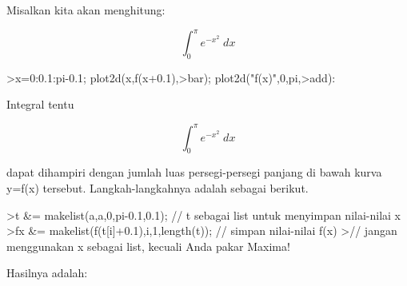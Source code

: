 \documentclass[a4paper,10pt]{article}
\begin{document}
\begin{eulernotebook}
\begin{eulercomment}
\begin{eulercomment}
\begin{eulercomment}
\begin{eulercomment}
\begin{eulercomment}
\begin{eulercomment}
\begin{eulercomment}
\begin{eulercomment}
\begin{eulercomment}
\begin{eulercomment}
\begin{eulercomment}
\begin{eulercomment}
\begin{eulercomment}
\begin{eulercomment}
\begin{eulercomment}
\begin{eulercomment}
\begin{eulercomment}
\begin{eulercomment}
\begin{eulercomment}
\begin{eulercomment}
\begin{eulercomment}
Misalkan kita akan menghitung:

\end{eulercomment}
\begin{eulerformula}
\[
\int_{0}^{\pi}{e^ {- x^2 }\;dx}
\]
\end{eulerformula}
\begin{eulerprompt}
>x=0:0.1:pi-0.1; plot2d(x,f(x+0.1),>bar); plot2d("f(x)",0,pi,>add):
\end{eulerprompt}
\begin{eulercomment}
Integral tentu

\end{eulercomment}
\begin{eulerformula}
\[
\int_{0}^{\pi}{e^ {- x^2 }\;dx}
\]
\end{eulerformula}
\begin{eulercomment}
dapat dihampiri dengan jumlah luas persegi-persegi panjang di bawah
kurva y=f(x) tersebut. Langkah-langkahnya adalah sebagai berikut.
\end{eulercomment}
\begin{eulerprompt}
>t &= makelist(a,a,0,pi-0.1,0.1); // t sebagai list untuk menyimpan nilai-nilai x
>fx &= makelist(f(t[i]+0.1),i,1,length(t)); // simpan nilai-nilai f(x)
>// jangan menggunakan x sebagai list, kecuali Anda pakar Maxima!
\end{eulerprompt}
\begin{eulercomment}
Hasilnya adalah:


\end{eulercomment}
\end{eulercomment}
\end{eulercomment}
\end{eulercomment}
\end{eulercomment}
\end{eulercomment}
\end{eulercomment}
\end{eulercomment}
\end{eulercomment}
\end{eulercomment}
\end{eulercomment}
\end{eulercomment}
\end{eulercomment}
\end{eulercomment}
\end{eulercomment}
\end{eulercomment}
\end{eulercomment}
\end{eulercomment}
\end{eulercomment}
\end{eulercomment}
\end{eulercomment}
\end{eulernotebook}
\end{document}
